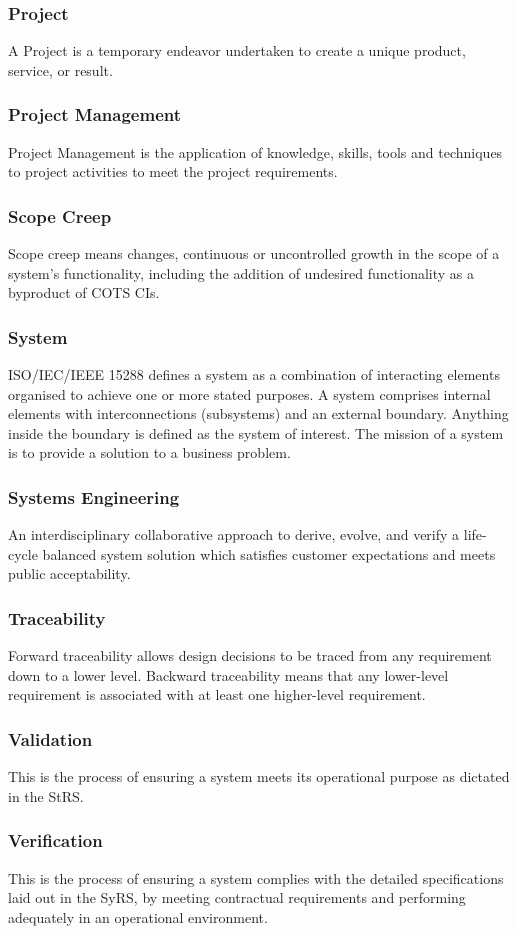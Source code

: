 \documentclass[journal]{IEEEtran}
\begin{document}
\subsubsection{Project}
A Project is a temporary endeavor undertaken to create a unique product, service, or result.
\subsubsection{Project Management}
Project Management is the application of knowledge, skills, tools and techniques to project activities to meet the project requirements.
\subsubsection{Scope Creep}
Scope creep means changes, continuous or uncontrolled growth in the scope of a system's functionality, including the addition of undesired functionality as a byproduct of COTS CIs.
\subsubsection{System}
ISO/IEC/IEEE 15288 defines a system as a combination of interacting elements organised to achieve one or more stated purposes. A system comprises internal elements with interconnections (subsystems) and an external boundary. Anything inside the boundary is defined as the system of interest. The mission of a system is to provide a solution to a business problem.
\subsubsection{Systems Engineering}
An interdisciplinary collaborative approach to derive, evolve, and verify a life-cycle balanced system solution which satisfies customer expectations and meets public acceptability.
\subsubsection{Traceability}
Forward	traceability	allows design decisions to be	traced from any requirement down	to a	lower level. Backward	 traceability means that any lower-level requirement is associated with at least one higher-level requirement.
\subsubsection{Validation}
This is the process of ensuring a system meets its operational purpose as dictated in the StRS.
\subsubsection{Verification}
This is the process of ensuring a system complies with the detailed specifications laid out in the SyRS, by meeting contractual requirements and performing adequately in an operational environment.
\end{document}
